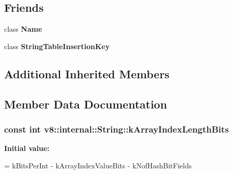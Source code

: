\subsection*{Friends}
\begin{DoxyCompactItemize}
\item 
class {\bfseries Name}\hypertarget{classv8_1_1internal_1_1_string_aa5584a36f0e4c358cedb1416f5429051}{}\label{classv8_1_1internal_1_1_string_aa5584a36f0e4c358cedb1416f5429051}

\item 
class {\bfseries String\+Table\+Insertion\+Key}\hypertarget{classv8_1_1internal_1_1_string_a1fbe4fdc255e8e29ccb2f71a44347fce}{}\label{classv8_1_1internal_1_1_string_a1fbe4fdc255e8e29ccb2f71a44347fce}

\end{DoxyCompactItemize}
\subsection*{Additional Inherited Members}


\subsection{Member Data Documentation}
\subsubsection[{\texorpdfstring{k\+Array\+Index\+Length\+Bits}{kArrayIndexLengthBits}}]{\setlength{\rightskip}{0pt plus 5cm}const int v8\+::internal\+::\+String\+::k\+Array\+Index\+Length\+Bits\hspace{0.3cm}{\ttfamily [static]}}\hypertarget{classv8_1_1internal_1_1_string_a40f3f35fdb15a8ec4fba2a0ca72a6342}{}\label{classv8_1_1internal_1_1_string_a40f3f35fdb15a8ec4fba2a0ca72a6342}
{\bfseries Initial value\+:}
\begin{DoxyCode}
=
      kBitsPerInt - kArrayIndexValueBits - kNofHashBitFields
\end{DoxyCode}
